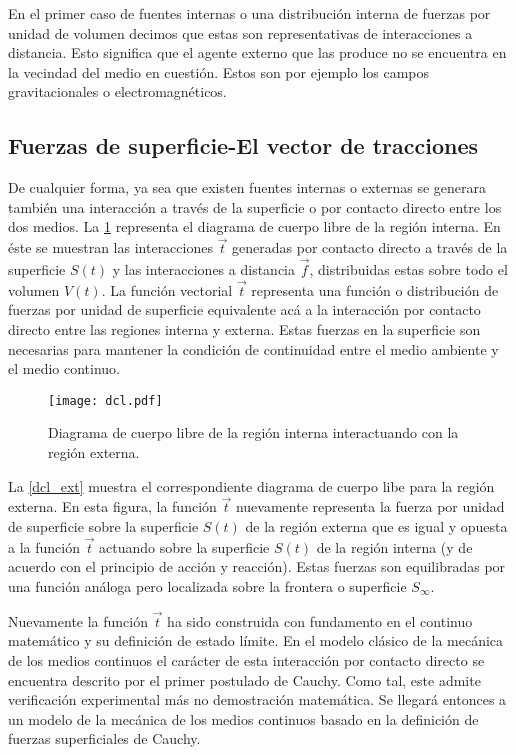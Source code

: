\documentclass[../notas medios.tex]{subfiles}
\begin{document}
En el primer caso de fuentes internas o una distribución interna de fuerzas por
unidad de volumen decimos que estas son representativas de interacciones a
distancia. Esto significa que el agente externo que las produce no se encuentra
en la vecindad del medio en cuestión. Estos son por ejemplo los campos
gravitacionales o electromagnéticos.

\subsection{Fuerzas de superficie-El vector de tracciones}
De cualquier forma, ya sea que existen fuentes internas o externas se generara
también una interacción a través de la superficie o por contacto directo entre
los dos medios. La \cref{dcl_rep} representa el diagrama de cuerpo libre de la
región interna. En éste se muestran las interacciones $\vec t$ generadas por
contacto directo a través de la superficie $S(t)$ y las interacciones a
distancia $\vec f$, distribuidas estas sobre todo el volumen $V(t)$. La
función vectorial $\vec t$ representa una función o distribución de fuerzas por
unidad de superficie equivalente acá a la interacción por contacto directo entre
las regiones interna y externa. Estas fuerzas en la superficie son necesarias
para mantener la condición de continuidad entre el medio ambiente y el medio continuo.

\begin{figure}[H]
\centering
	\texttt{[image: dcl.pdf]}
	\caption{Diagrama de cuerpo libre de la región interna interactuando con la región externa.}
	\label{dcl_rep}
\end{figure}
%
La \cref{dcl_ext} muestra el correspondiente diagrama de cuerpo libe para la
región externa. En esta figura, la función $\vec t$ nuevamente representa la
fuerza por unidad de superficie sobre la superficie $S(t)$ de la región externa
que es igual y opuesta a la función $\vec t$ actuando sobre la superficie $S(t)$
de la región interna (y de acuerdo con el principio de acción y reacción). Estas
fuerzas son equilibradas por una función análoga pero localizada sobre la frontera o superficie ${S_\infty }$.

Nuevamente la función $\vec t$ ha sido construida con fundamento en el continuo
matemático y su definición de estado límite. En el modelo clásico de la mecánica
de los medios continuos el carácter de esta interacción por contacto directo se
encuentra descrito por el primer postulado de Cauchy.  Como tal, este admite
verificación experimental más no demostración matemática.  Se llegará entonces a
un modelo de la mecánica de los medios continuos basado en la definición de fuerzas superficiales de Cauchy.
\end{document}
